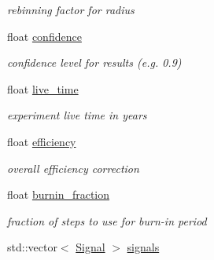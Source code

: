 \begin{DoxyCompactItemize}
\begin{DoxyCompactList}\small\item\em rebinning factor for radius \item\end{DoxyCompactList}\item 
\hypertarget{classFitConfig_a994761af35b94c1f041577cf429cd2a5}{
float \hyperlink{classFitConfig_a994761af35b94c1f041577cf429cd2a5}{confidence}}
\label{classFitConfig_a994761af35b94c1f041577cf429cd2a5}

\begin{DoxyCompactList}\small\item\em confidence level for results (e.g. 0.9) \item\end{DoxyCompactList}\item 
\hypertarget{classFitConfig_a71256d7713172bafa18e2919a1d3ed7d}{
float \hyperlink{classFitConfig_a71256d7713172bafa18e2919a1d3ed7d}{live\_\-time}}
\label{classFitConfig_a71256d7713172bafa18e2919a1d3ed7d}

\begin{DoxyCompactList}\small\item\em experiment live time in years \item\end{DoxyCompactList}\item 
\hypertarget{classFitConfig_a1ff10d745bba35a46815c06887afebb1}{
float \hyperlink{classFitConfig_a1ff10d745bba35a46815c06887afebb1}{efficiency}}
\label{classFitConfig_a1ff10d745bba35a46815c06887afebb1}

\begin{DoxyCompactList}\small\item\em overall efficiency correction \item\end{DoxyCompactList}\item 
\hypertarget{classFitConfig_a29dbb355092eb72bf9ad50cc75c65fe9}{
float \hyperlink{classFitConfig_a29dbb355092eb72bf9ad50cc75c65fe9}{burnin\_\-fraction}}
\label{classFitConfig_a29dbb355092eb72bf9ad50cc75c65fe9}

\begin{DoxyCompactList}\small\item\em fraction of steps to use for burn-\/in period \item\end{DoxyCompactList}\item 
\hypertarget{classFitConfig_a792ef6696bc7629ccc34ff7eca66cd48}{
std::vector$<$ \hyperlink{structSignal}{Signal} $>$ \hyperlink{classFitConfig_a792ef6696bc7629ccc34ff7eca66cd48}{signals}}
\label{classFitConfig_a792ef6696bc7629ccc34ff7eca66cd48}


\end{DoxyCompactItemize}
